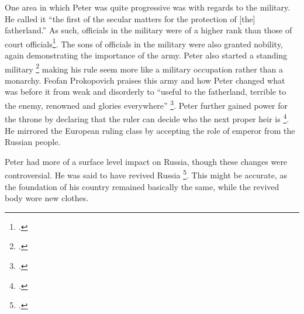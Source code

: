 \documentclass[titlepage]{article}
\begin{document}
One area in which Peter was quite progressive was with regards to the military.
He called it ``the first of the secular matters for the protection of [the] fatherland.''
As such, officials in the military were of a higher rank than those of court officials\footcite{decrees}.
The sons of officials in the military were also granted nobility,
again demonstrating the importance of the army.
Peter also started a standing military \footcite[114]{decrees}
making his rule seem more like a military occupation rather than a monarchy.
Feofan Prokopovich praises this army and how Peter changed what was before it 
from weak and disorderly to ``useful to the fatherland, terrible to the enemy, renowned and glories everywhere'' \footcite[124]{decrees}.
Peter further gained power for the throne by declaring that
the ruler can decide who the next proper heir is \footcite[115]{decrees}.
He mirrored the European ruling class by accepting the role of emperor from the Russian people.

Peter had more of a surface level impact on Russia, though these changes were controversial.
He was said to have revived Russia \footcite[123]{decrees}.
This might be accurate, as the foundation of his country remained basically the same,
while the revived body wore new clothes.

\singlespacing
\printbibliography
\end{document}

